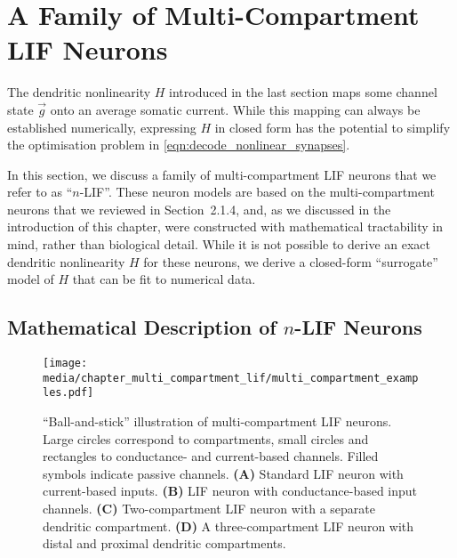 \section{A Family of Multi-Compartment LIF Neurons}
\label{sec:nlif}

The dendritic nonlinearity $H$ introduced in the last section maps some channel state $\vec g$ onto an average somatic current.
While this mapping can always be established numerically, expressing $H$ in closed form has the potential to simplify the optimisation problem in \cref{eqn:decode_nonlinear_synapses}.

In this section, we discuss a family of multi-compartment LIF neurons that we refer to as \enquote{$n$-LIF}.
These neuron models are based on the multi-compartment neurons that we reviewed in Section~2.1.4, and, as we discussed in the introduction of this chapter, were constructed with mathematical tractability in mind, rather than biological detail.
While it is not possible to derive an exact dendritic nonlinearity $H$ for these neurons, we derive a closed-form \enquote{surrogate} model of $H$ that can be fit to numerical data.

\subsection{Mathematical Description of $n$-LIF Neurons}
\label{sec:nlif_description}

\begin{figure}
	\texttt{[image: media/chapter\_multi\_compartment\_lif/multi\_compartment\_examples.pdf]}%
	{\label{fig:nlif_a}}%
	{\label{fig:nlif_b}}%
	{\label{fig:nlif_c}}%
	{\label{fig:nlif_d}}%
	\caption[\enquote{Ball-and-stick} illustration of multi-compartment LIF neurons]{\enquote{Ball-and-stick} illustration of multi-compartment LIF neurons.
	Large circles correspond to compartments, small circles and rectangles to conductance- and current-based channels. Filled symbols indicate passive channels.
	\textbf{(A)} Standard LIF neuron with current-based inputs.
	\textbf{(B)} LIF neuron with conductance-based input channels.
	\textbf{(C)} Two-compartment LIF neuron with a separate dendritic compartment.
	\textbf{(D)} A three-compartment LIF neuron with distal and proximal dendritic compartments.}
	\label{fig:nlif}
\end{figure}

